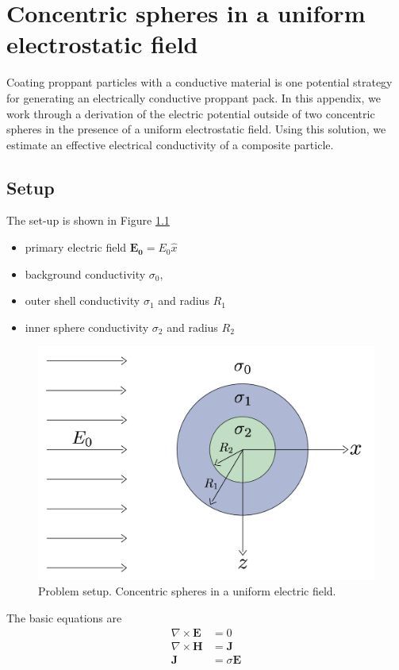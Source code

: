 \chapter{Concentric spheres in a uniform electrostatic field}
Coating proppant particles with a conductive material is one potential strategy for generating an electrically conductive proppant pack. In this appendix, we work through a derivation of the electric potential outside of two concentric spheres in the presence of a uniform electrostatic field. Using this solution, we estimate an effective electrical conductivity of a composite particle.

\section{Setup}
The set-up is shown in Figure \ref{fig:concentric_sphere_setup}
\begin{itemize}
    \item primary electric field $\mathbf{E_0} = E_0 \hat{x}$
    \item background conductivity $\sigma_0$,
    \item outer shell conductivity $\sigma_1$ and radius $R_1$
    \item inner sphere conductivity $\sigma_2$ and radius $R_2$
\end{itemize}

\begin{figure}[htb!]
    \centering
    \includegraphics[width=0.6\linewidth]{figures/appendix1/setup}
        \caption{Problem setup. Concentric spheres in a uniform electric field.}
        \label{fig:concentric_sphere_setup}
\end{figure}

The basic equations are
\begin{align}
    \nabla \times \mathbf{E} &= 0  \label{eq:curlE}\\
    \nabla \times \mathbf{H} &= \mathbf{J}\label{eq:curlH}\\
    \mathbf{J} &= \sigma \mathbf{E} \label{eq:JsigE}
\end{align}

